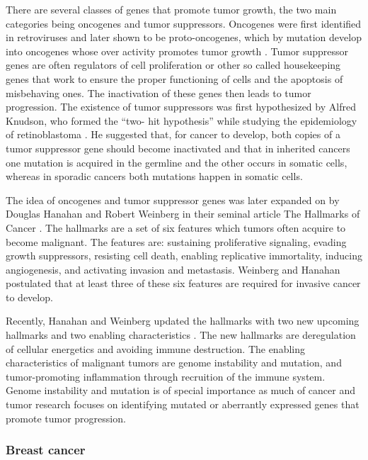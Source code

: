 There are several classes of genes that promote tumor growth, the two main
categories being oncogenes and tumor suppressors. Oncogenes were first
identified in retroviruses and later shown to be proto-oncogenes, which by
mutation develop into oncogenes whose over activity promotes tumor growth
\citep{Varmus1988}. Tumor suppressor genes are often regulators of cell
proliferation or other so called housekeeping genes that work to ensure the
proper functioning of cells and the apoptosis of misbehaving ones. The
inactivation of these genes then leads to tumor progression. The existence of
tumor suppressors was first hypothesized by Alfred Knudson, who formed the “two-
hit hypothesis” while studying the epidemiology of retinoblastoma
\citep{Knudson1971}. He suggested that, for cancer to develop, both copies of
a tumor suppressor gene should become inactivated and that in inherited
cancers one mutation is acquired in the germline and the other occurs in
somatic cells, whereas in sporadic cancers both mutations happen in somatic
cells.

The idea of oncogenes and tumor suppressor genes was later expanded on by
Douglas Hanahan and Robert Weinberg in their seminal article The Hallmarks of
Cancer \citep{Hanahan2000}. The hallmarks are a set of six features which
tumors often acquire to become malignant. The features are: sustaining
proliferative signaling, evading growth suppressors, resisting cell death,
enabling replicative immortality, inducing angiogenesis, and activating
invasion and metastasis. Weinberg and Hanahan postulated that at least three
of these six features are required for invasive cancer to develop.

Recently, Hanahan and Weinberg updated the hallmarks with two new upcoming
hallmarks and two enabling characteristics \citep{Hanahan2011}. The new
hallmarks are deregulation of cellular energetics and avoiding immune
destruction. The enabling characteristics of malignant tumors are genome
instability and mutation, and tumor-promoting inflammation through recruition
of the immune system. Genome instability and mutation is of special importance
as much of cancer and tumor research focuses  on identifying mutated or
aberrantly expressed genes that promote tumor progression.



\subsubsection{Breast cancer}\label{breast-cancer}

